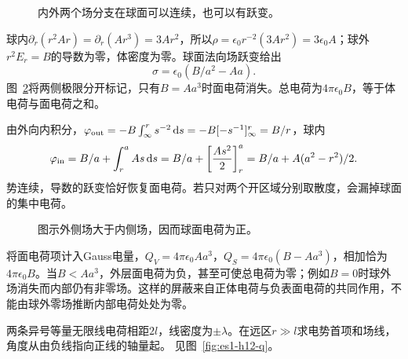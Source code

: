 \begin{figure}[H]\centering
{}
\caption{内外两个场分支在球面可以连续，也可以有跃变。}\label{fig:es1-h11-q}
\end{figure}
\begin{solution}
球内$\partial_r(r^2Ar)=\partial_r(Ar^3)=3Ar^2$，所以$\rho=\epsilon_0r^{-2}(3Ar^2)=3\epsilon_0A$；球外$r^2E_r=B$的导数为零，体密度为零。球面法向场跃变给出
\[\boxed{\sigma=\epsilon_0(B/a^2-Aa)}.\]
图~\ref{fig:es1-h11-s}将两侧极限分开标记，只有$B=Aa^3$时面电荷消失。总电荷为$4\pi\epsilon_0B$，等于体电荷与面电荷之和。

由外向内积分，$\varphi_{\rm out}=-B\int_\infty^r s^{-2}\mathop{}\!\mathrm d s=-B[-s^{-1}]_\infty^r=B/r$，球内
\[\varphi_{\rm in}=B/a+\int_r^aAs\mathop{}\!\mathrm d s
=B/a+\left[\frac{As^2}{2}\right]_r^a
=B/a+A(a^2-r^2)/2.\]
势连续，导数的跃变恰好恢复面电荷。若只对两个开区域分别取散度，会漏掉球面的集中电荷。
\begin{figure}[H]\centering
{}
\caption{图示外侧场大于内侧场，因而球面电荷为正。}\label{fig:es1-h11-s}
\end{figure}


将面电荷项计入Gauss电量，$Q_V=4\pi\epsilon_0Aa^3$，$Q_S=4\pi\epsilon_0(B-Aa^3)$，相加恰为$4\pi\epsilon_0B$。当$B< Aa^3$，外层面电荷为负，甚至可使总电荷为零；例如$B=0$时球外场消失而内部仍有非零场。这样的屏蔽来自正体电荷与负表面电荷的共同作用，不能由球外零场推断内部电荷处处为零。
\end{solution}

\begin{exercise}[线偶极的远区场]\label{ex:es1-h12}
两条异号等量无限线电荷相距$2l$，线密度为$\pm\lambda$。在远区$r\gg l$求电势首项和场线，角度从由负线指向正线的轴量起。 见图~\ref{fig:es1-h12-q}。
\end{exercise}

